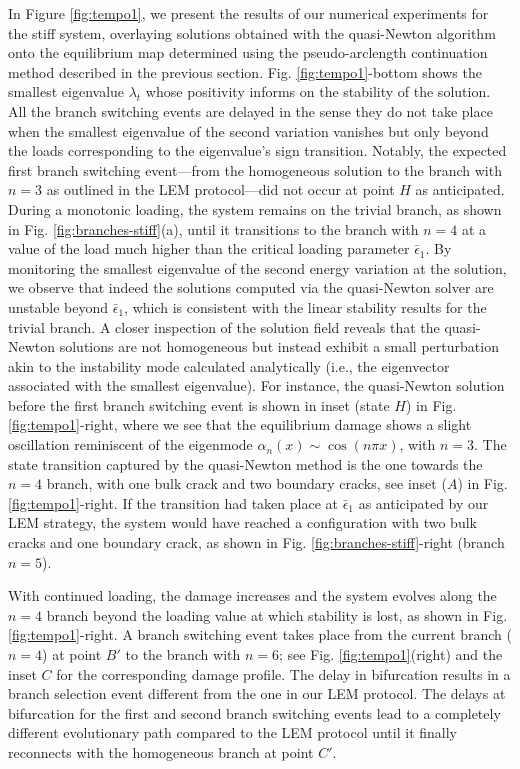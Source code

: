 \documentclass[10pt]{article}
\begin{document}
In Figure \ref{fig:tempo1}, we present the results of our numerical experiments for the stiff system, overlaying solutions obtained with the quasi-Newton algorithm onto the equilibrium map determined using the pseudo-arclength continuation method described in the previous section. Fig. \ref{fig:tempo1}-bottom shows the smallest eigenvalue $\lambda_t$ whose positivity informs on the stability of the solution. All the branch switching events are delayed in the sense they do not take place when the smallest eigenvalue of the second variation vanishes but only beyond the loads corresponding to the eigenvalue's sign transition. Notably, the expected first branch switching event—from the {homogeneous} solution to the branch with \(n=3\) as outlined in the LEM protocol—did not occur at point $H$ as anticipated. During a monotonic loading, the system remains on the trivial branch, as shown in Fig. \ref{fig:branches-stiff}(a), until it transitions to the branch with \(n=4\) at a value of the load much higher than the critical loading parameter \(\bar{\epsilon}_1\). By monitoring the smallest eigenvalue of the second energy variation at the solution, we observe that indeed the solutions computed via the quasi-Newton solver are unstable beyond \(\bar{\epsilon}_1\), which is consistent with the linear stability results for the trivial branch. A closer inspection of the solution field reveals that the quasi-Newton solutions are not homogeneous but instead exhibit a small perturbation akin to the instability mode calculated analytically (i.e., the eigenvector associated with the smallest eigenvalue). For instance, the  quasi-Newton solution before the first branch switching event is shown in inset (state $H$) in Fig. \ref{fig:tempo1}-right, where we see that the equilibrium damage shows a slight oscillation reminiscent of the eigenmode \(\alpha_n(x) \sim \cos(n\pi x)\), with \(n=3\). The state transition captured by the quasi-Newton method is the one towards the \(n=4\) branch, with one bulk crack and two boundary cracks, see inset ($A$) in Fig. \ref{fig:tempo1}-right. If the transition had taken place at \(\bar{\epsilon}_1\) as anticipated by our LEM strategy, the system would have reached a configuration with two bulk cracks and one boundary crack, as shown in Fig. \ref{fig:branches-stiff}-right (branch $n=5$).

With continued loading, the damage increases and the system evolves along the \(n=4\) branch beyond the loading value at which stability is lost, as shown in Fig. \ref{fig:tempo1}-right. A  branch switching event takes place from the current branch (\(n=4\)) at point \(B'\) to the branch with \(n=6\); see Fig. \ref{fig:tempo1}(right) and the inset $C$ for the corresponding damage profile. The delay in bifurcation results in a branch selection event different from the one in our LEM protocol. The delays at bifurcation for the first and second branch switching events lead to a completely different evolutionary path compared to the LEM protocol until it finally reconnects with the homogeneous branch at point \(C'\).
\end{document}
